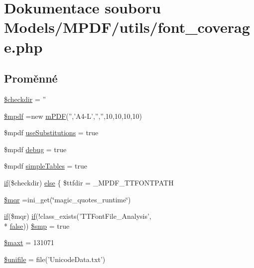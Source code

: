 \hypertarget{font__coverage_8php}{\section{Dokumentace souboru Models/\-M\-P\-D\-F/utils/font\-\_\-coverage.php}
\label{font__coverage_8php}
}
\subsection*{Proměnné}
\begin{DoxyCompactItemize}
\item 
\hyperlink{font__coverage_8php_ad773ebf7841c6538baa63f9945d7c9ca}{\$checkdir} = ''
\item 
\hyperlink{font__coverage_8php_ad028f81910d6cbab9b184d2214b3a8f8}{\$mpdf} =new \hyperlink{classm_p_d_f}{m\-P\-D\-F}('','A4-\/L','','',10,10,10,10)
\item 
\$mpdf \hyperlink{font__coverage_8php_aa2ce4c2c0ab99d3365e4d7366a9be33a}{use\-Substitutions} = true
\item 
\$mpdf \hyperlink{font__coverage_8php_a200a436f1833a712239f1ae5bec608db}{debug} = true
\item 
\$mpdf \hyperlink{font__coverage_8php_a87bf4d3d8114a506fea7f0fc5f0714f6}{simple\-Tables} = true
\item 
\hyperlink{pdf__parser_8php_af8105e84b42a9ceda5357caeb6c4760b}{if}(\$checkdir) \hyperlink{font__coverage_8php_a5271a2344cca2dc08862484f40ba9273}{else} \{ \$ttfdir = \-\_\-\-M\-P\-D\-F\-\_\-\-T\-T\-F\-O\-N\-T\-P\-A\-T\-H
\item 
\hyperlink{font__coverage_8php_ad04a9e91774b9f9d3044e0c2b7636ca1}{\$mqr} =ini\-\_\-get(\char`\"{}magic\-\_\-quotes\-\_\-runtime\char`\"{})
\item 
\hyperlink{pdf__parser_8php_af8105e84b42a9ceda5357caeb6c4760b}{if}(\$mqr) \hyperlink{pdf__parser_8php_af8105e84b42a9ceda5357caeb6c4760b}{if}(!class\-\_\-exists('T\-T\-Font\-File\-\_\-\-Analysis', \\*
\hyperlink{ttfontsuni_8php_afbaa04e5cc97693dc668b3c45d3dd740}{false})) \hyperlink{font__coverage_8php_af4d78da859f2fb6f8d313e16bba59647}{\$smp} = true
\item 
\hyperlink{font__coverage_8php_a6f59d03d2504b6c14d08ff0d12d56f4e}{\$maxt} = 131071
\item 
\hyperlink{font__coverage_8php_abaa85dced3638e9abc7f47111f04df8e}{\$unifile} = file('Unicode\-Data.\-txt')
\item 

\end{DoxyCompactItemize}

